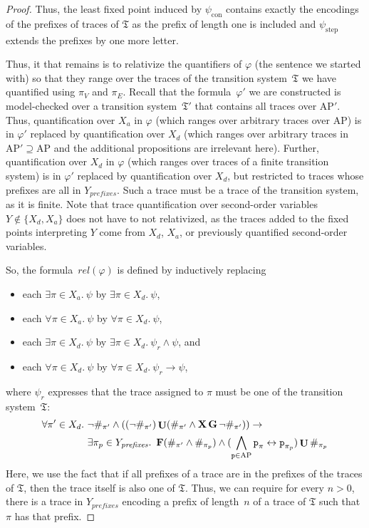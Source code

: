\documentclass[dvipsnames,10pt,a4paper]{amsart}
\theoremstyle{definition}
\theoremstyle{remark}
\renewcommand{\phi}{\varphi}
\newcommand{\set}[1]{\{#1\}}
\newcommand{\F}{\mathop{\mathbf{F}\vphantom{a}}\nolimits}
\newcommand{\G}{\mathop{\mathbf{G}\vphantom{a}}\nolimits}
\DeclareMathOperator{\U}{\mathbf{U}}
\newcommand{\X}{\mathop{\mathbf{X}\vphantom{a}}\nolimits}
\newcommand{\ap}[0]{\mathrm{AP}}
\newcommand{\univar}{X_a}
\newcommand{\unidisvar}{X_d}
\newcommand{\tsys}{\mathfrak{T}}
\newcommand{\proposition}{\texttt{p}}
\newcommand{\con}{\mathrm{con}}
\newcommand{\step}{\mathrm{step}}
\newcommand{\vertices}{\mathit{V}}
\newcommand{\edges}{\mathit{E}}
\newcommand{\prefixes}{\mathit{prefixes}}
\newcommand{\rel}{\mathit{rel}}
\begin{document}
\begin{proof}
Thus, the least fixed point induced by $\psi_\con$ contains exactly the encodings of the prefixes of traces of $\tsys$ as the prefix of length one is included and $\psi_\step$ extends the prefixes by one more letter.

Thus, it that remains is to relativize the quantifiers of $\phi$ (the sentence we started with) so that they range over the traces of the transition system~$\tsys$ we have quantified using $\pi_\vertices$ and $\pi_\edges$.
Recall that the formula~$\varphi'$ we are constructed is model-checked over a transition system~$\tsys'$ that contains all traces over $\ap'$.
Thus, quantification over $\univar$ in $\phi$ (which ranges over arbitrary traces over $\ap$) is in $\varphi'$ replaced by quantification over $\unidisvar$ (which ranges over arbitrary traces in $\ap' \supseteq \ap$ and the additional propositions are irrelevant here).
Further, quantification over $\unidisvar$ in $\phi$ (which ranges over traces of a finite transition system) is in $\varphi'$ replaced by quantification over $\unidisvar$, but restricted to traces whose prefixes are all in $Y_\prefixes$. 
Such a trace must be a trace of the transition system, as it is finite.
Note that trace quantification over second-order variables~$Y \notin \set{\unidisvar,\univar}$ does not have to not relativized, as the traces added to the fixed points interpreting $Y$ come from $\unidisvar$, $\univar$, or previously quantified second-order variables. 

So, the formula~$\rel(\phi)$ is defined by inductively replacing
\begin{itemize}
    \item each $\exists \pi \in \univar.\ \psi$ by $\exists \pi \in \unidisvar.\ \psi$, 
    
    \item each $\forall \pi \in \univar.\ \psi$ by $\forall \pi \in \unidisvar.\ \psi$, 
    
    \item each $\exists \pi \in \unidisvar.\ \psi$ by $\exists \pi \in \unidisvar.\ \psi_r \wedge \psi$, and 
    
    \item each $\forall \pi \in \unidisvar.\ \psi$ by $\forall \pi \in \unidisvar.\ \psi_r \rightarrow \psi$,
\end{itemize}
where $\psi_r$ expresses that the trace assigned to $\pi$ must be one of the transition system~$\tsys$:
\begin{align*}
\forall \pi' \in \unidisvar.\ {}&{} \neg\#_{\pi'} \wedge ((\neg\#_{\pi'})\U(\#_{\pi'}\wedge \X\G\neg \#_{\pi'})) \rightarrow \\
{}&{}\exists \pi_p\in Y_\prefixes.\ \F(\#_{\pi'} \wedge \#_{\pi_p}) \wedge (\bigwedge_{\proposition\in\ap} \proposition_{\pi} \leftrightarrow \proposition_{\pi_p})\U\#_{\pi_p}
\end{align*}
Here, we use the fact that if all prefixes of a trace are in the prefixes of the traces of $\tsys$, then the trace itself is also one of $\tsys$. Thus, we can require for every $n > 0$, 
there is a trace in $Y_\prefixes$ encoding a prefix of length~$n$ of a trace of $\tsys$ such that $\pi$ has that prefix. 


\end{proof}
\end{document}
